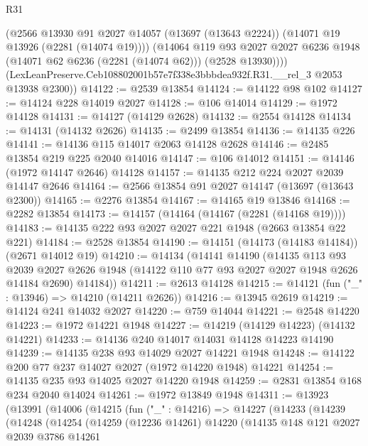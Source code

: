 \begin{lexlean}{R31}
\begin{coremodule}
          (@2566
            @13930
            @91
            @2027
            @14057
            (@13697 (@13643 @2224))
            (@14071 @19 @13926 (@2281 (@14074 @19))))
          (@14064
            @119
            @93
            @2027
            @2027
            @6236
            @1948
            (@14071 @62 @6236 (@2281 (@14074 @62)))
            (@2528 @13930))))
      (LexLeanPreserve.Ceb108802001b57e7f338e3bbbdea932f.R31.__rel_3 @2053 @13938 @2300))
@14122 := @2539 @13854
@14124 := @14122 @98 @102
@14127 := @14124 @228 @14019 @2027
@14128 := @106 @14014
@14129 := @1972 @14128
@14131 := @14127 (@14129 @2628)
@14132 := @2554 @14128
@14134 := @14131 (@14132 @2626)
@14135 := @2499 @13854
@14136 := @14135 @226
@14141 := @14136 @115 @14017 @2063 @14128 @2628
@14146 := @2485 @13854 @219 @225 @2040 @14016
@14147 := @106 @14012
@14151 := @14146 (@1972 @14147 @2646) @14128
@14157 := @14135 @212 @224 @2027 @2039 @14147 @2646
@14164 := @2566 @13854 @91 @2027 @14147 (@13697 (@13643 @2300))
@14165 := @2276 @13854
@14167 := @14165 @19 @13846
@14168 := @2282 @13854
@14173 := @14157 (@14164 (@14167 (@2281 (@14168 @19))))
@14183 := @14135 @222 @93 @2027 @2027 @221 @1948 (@2663 @13854 @22 @221)
@14184 := @2528 @13854
@14190 := @14151 (@14173 (@14183 @14184)) (@2671 @14012 @19)
@14210 := @14134
    (@14141
      @14190
      (@14135
        @113
        @93
        @2039
        @2027
        @2626
        @1948
        (@14122 @110 @77 @93 @2027 @2027 @1948 @2626 @14184 @2690)
        @14184))
@14211 := @2613 @14128
@14215 := @14121 (fun ("_" : @13946) => @14210 (@14211 @2626))
@14216 := @13945 @2619
@14219 := @14124 @241 @14032 @2027
@14220 := @759 @14044
@14221 := @2548 @14220
@14223 := @1972 @14221 @1948
@14227 := @14219 (@14129 @14223) (@14132 @14221)
@14233 := @14136 @240 @14017 @14031 @14128 @14223 @14190
@14239 := @14135 @238 @93 @14029 @2027 @14221 @1948
@14248 := @14122 @200 @77 @237 @14027 @2027 (@1972 @14220 @1948) @14221
@14254 := @14135 @235 @93 @14025 @2027 @14220 @1948
@14259 := @2831 @13854 @168 @234 @2040 @14024
@14261 := @1972 @13849 @1948
@14311 := @13923
    (@13991
      (@14006
        (@14215
          (fun ("_" : @14216) =>
          @14227
            (@14233
              (@14239
                (@14248
                  (@14254
                    (@14259
                      (@12236 @14261)
                      @14220
                      (@14135
                        @148
                        @121
                        @2027
                        @2039
                        @3786
                        @14261

\end{coremodule}
\end{lexlean}

